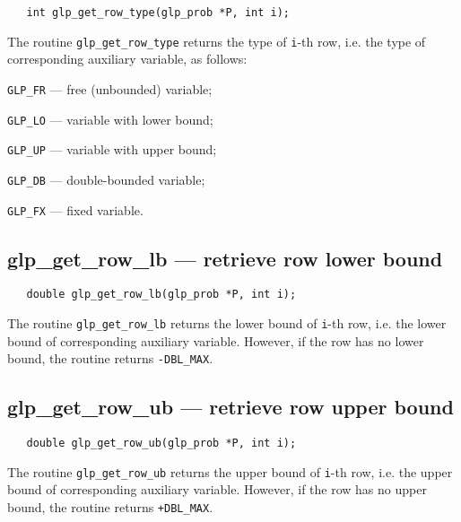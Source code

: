 \synopsis

\begin{verbatim}
   int glp_get_row_type(glp_prob *P, int i);
\end{verbatim}

\returns

The routine \verb|glp_get_row_type| returns the type of \verb|i|-th
row, i.e. the type of corresponding auxiliary variable, as follows:

\verb|GLP_FR| --- free (unbounded) variable;

\verb|GLP_LO| --- variable with lower bound;

\verb|GLP_UP| --- variable with upper bound;

\verb|GLP_DB| --- double-bounded variable;

\verb|GLP_FX| --- fixed variable.

\subsection{glp\_get\_row\_lb --- retrieve row lower bound}

\synopsis

\begin{verbatim}
   double glp_get_row_lb(glp_prob *P, int i);
\end{verbatim}

\returns

The routine \verb|glp_get_row_lb| returns the lower bound of
\verb|i|-th row, i.e. the lower bound of corresponding auxiliary
variable. However, if the row has no lower bound, the routine returns
\verb|-DBL_MAX|.

\vspace*{-4pt}

\subsection{glp\_get\_row\_ub --- retrieve row upper bound}

\synopsis

\begin{verbatim}
   double glp_get_row_ub(glp_prob *P, int i);
\end{verbatim}

\returns

The routine \verb|glp_get_row_ub| returns the upper bound of
\verb|i|-th row, i.e. the upper bound of corresponding auxiliary
variable. However, if the row has no upper bound, the routine returns
\verb|+DBL_MAX|.

